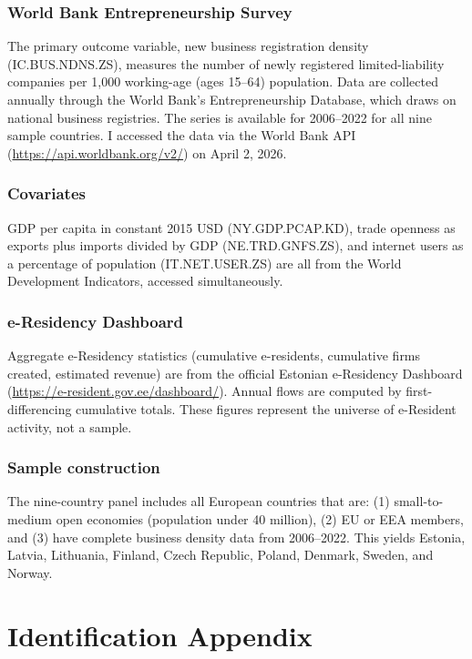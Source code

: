\documentclass[12pt]{article}
\begin{document}
\subsubsection*{World Bank Entrepreneurship Survey} The primary outcome variable, new business registration density (IC.BUS.NDNS.ZS), measures the number of newly registered limited-liability companies per 1,000 working-age (ages 15--64) population. Data are collected annually through the World Bank's Entrepreneurship Database, which draws on national business registries. The series is available for 2006--2022 for all nine sample countries. I accessed the data via the World Bank API (\url{https://api.worldbank.org/v2/}) on April 2, 2026.

\subsubsection*{Covariates} GDP per capita in constant 2015 USD (NY.GDP.PCAP.KD), trade openness as exports plus imports divided by GDP (NE.TRD.GNFS.ZS), and internet users as a percentage of population (IT.NET.USER.ZS) are all from the World Development Indicators, accessed simultaneously.

\subsubsection*{e-Residency Dashboard} Aggregate e-Residency statistics (cumulative e-residents, cumulative firms created, estimated revenue) are from the official Estonian e-Residency Dashboard (\url{https://e-resident.gov.ee/dashboard/}). Annual flows are computed by first-differencing cumulative totals. These figures represent the universe of e-Resident activity, not a sample.

\subsubsection*{Sample construction} The nine-country panel includes all European countries that are: (1) small-to-medium open economies (population under 40 million), (2) EU or EEA members, and (3) have complete business density data from 2006--2022. This yields Estonia, Latvia, Lithuania, Finland, Czech Republic, Poland, Denmark, Sweden, and Norway.

\section{Identification Appendix}
\label{app:id}
\end{document}
